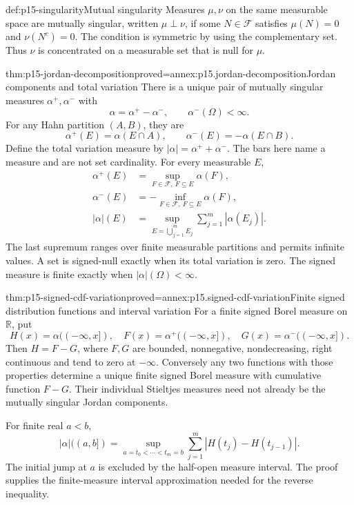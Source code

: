 \begin{hbdefinition}{def:p15-singularity}{Mutual singularity}
Measures \(\mu,\nu\) on the same measurable space are mutually singular,
written \(\mu\perp\nu\), if some \(N\in\mathcal F\) satisfies
\(\mu(N)=0\) and \(\nu(N^c)=0\).
The condition is symmetric by using the complementary set.
Thus \(\nu\) is concentrated on a measurable set that is null for \(\mu\).
\end{hbdefinition}

\begin{hbtheorem}{thm:p15-jordan-decomposition}{proved=annex:p15.jordan-decomposition}{Jordan components and total variation}
There is a unique pair of mutually singular measures
\(\alpha^+,\alpha^-\) with
\[
                 \alpha=\alpha^+-\alpha^-,
                 \qquad \alpha^-(\Omega)<\infty.
\]
For any Hahn partition \((A,B)\), they are
\[
           \alpha^+(E)=\alpha(E\cap A),\qquad
           \alpha^-(E)=-\alpha(E\cap B).
\]
Define the total variation measure by
\(\lvert\alpha\rvert=\alpha^++\alpha^-\).
The bars here name a measure and are not set cardinality.
For every measurable \(E\),
\[
 \begin{aligned}
 \alpha^+(E)&=\sup_{F\in\mathcal F,\ F\subseteq E}\alpha(F),\\
 \alpha^-(E)&=-\inf_{F\in\mathcal F,\ F\subseteq E}\alpha(F),\\
 \lvert\alpha\rvert(E)
   &=\sup_{E=\mathbin{\dot\bigcup}_{j=1}^m E_j}
                         \sum_{j=1}^m|\alpha(E_j)|.
 \end{aligned}
\]
The last supremum ranges over finite measurable partitions and permits
infinite values. A set is signed-null exactly when its total variation
is zero. The signed measure is finite exactly when
\(\lvert\alpha\rvert(\Omega)<\infty\).
\end{hbtheorem}

\begin{hbtheorem}{thm:p15-signed-cdf-variation}{proved=annex:p15.signed-cdf-variation}{Finite signed distribution functions and interval variation}
For a finite signed Borel measure on \(\mathbb R\), put
\[
 H(x)=\alpha((-\infty,x]),\quad
 F(x)=\alpha^+((-\infty,x]),\quad
 G(x)=\alpha^-((-\infty,x]).
\]
Then \(H=F-G\), where \(F,G\) are bounded, nonnegative, nondecreasing,
right continuous and tend to zero at \(-\infty\).
Conversely any two functions with those properties determine a unique
finite signed Borel measure with cumulative function \(F-G\).
Their individual Stieltjes measures need not already be the mutually
singular Jordan components.

For finite real \(a<b\),
\[
 \lvert\alpha\rvert((a,b])
  =\sup_{a=t_0<\cdots<t_m=b}
       \sum_{j=1}^m|H(t_j)-H(t_{j-1})|.
\]
The initial jump at \(a\) is excluded by the half-open measure interval.
The proof supplies the finite-measure interval approximation needed
for the reverse inequality.
\end{hbtheorem}

